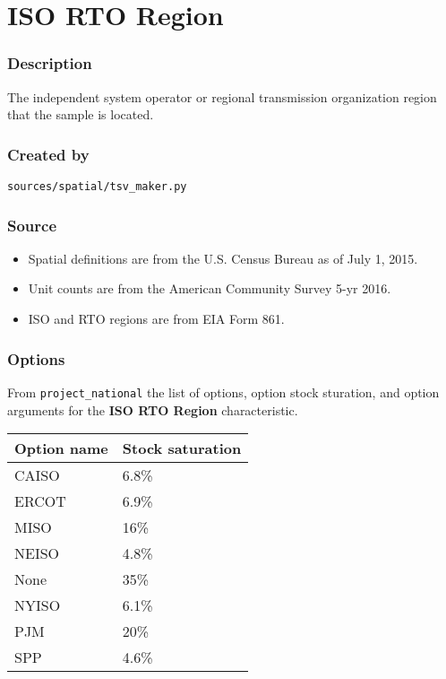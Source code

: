 \section{ISO RTO Region}\label{iso_rto_region}

\subsubsection{Description}\label{description-95}

The independent system operator or regional transmission organization
region that the sample is located.

\subsubsection{Created by}\label{created-by-95}

\texttt{sources/spatial/tsv\_maker.py}

\subsubsection{Source}\label{source-94}

\begin{itemize}
 
\item
  Spatial definitions are from the U.S. Census Bureau as of July 1,
  2015.
\item
  Unit counts are from the American Community Survey 5-yr 2016.
\item
  ISO and RTO regions are from EIA Form 861.
\end{itemize}

\subsubsection{Options}\label{options-95}

From \texttt{project\_national} the list of options, option stock
sturation, and option arguments for the \textbf{ISO RTO Region}
characteristic.

\begin{longtable}[]{@{}ll@{}}
\toprule\noalign{}
Option name & Stock saturation \\
\midrule\noalign{}
\endhead
\bottomrule\noalign{}
\endlastfoot
CAISO & 6.8\% \\
ERCOT & 6.9\% \\
MISO & 16\% \\
NEISO & 4.8\% \\
None & 35\% \\
NYISO & 6.1\% \\
PJM & 20\% \\
SPP & 4.6\% \\
\end{longtable}

